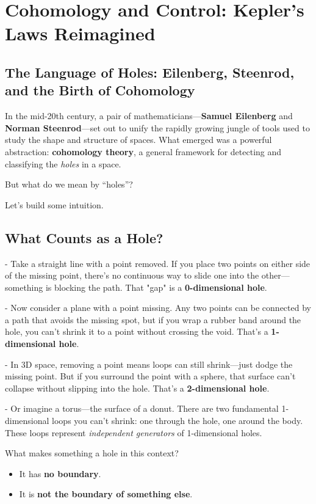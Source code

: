 \section{Cohomology and Control: Kepler’s Laws Reimagined}

\subsection{The Language of Holes: Eilenberg, Steenrod, and the Birth of Cohomology}

In the mid-20th century, a pair of mathematicians—\textbf{Samuel Eilenberg} and \textbf{Norman Steenrod}—set out to unify the rapidly growing jungle of tools used to study the shape and structure of spaces. What emerged was a powerful abstraction: \textbf{cohomology theory}, a general framework for detecting and classifying the \textit{holes} in a space.

But what do we mean by “holes”?

Let’s build some intuition.

\subsection{What Counts as a Hole?}

- Take a straight line with a point removed. If you place two points on either side of the missing point, there's no continuous way to slide one into the other—something is blocking the path. That "gap" is a \textbf{0-dimensional hole}.

- Now consider a plane with a point missing. Any two points can be connected by a path that avoids the missing spot, but if you wrap a rubber band around the hole, you can’t shrink it to a point without crossing the void. That’s a \textbf{1-dimensional hole}.

- In 3D space, removing a point means loops can still shrink—just dodge the missing point. But if you surround the point with a sphere, that surface can't collapse without slipping into the hole. That’s a \textbf{2-dimensional hole}.

- Or imagine a torus—the surface of a donut. There are two fundamental 1-dimensional loops you can't shrink: one through the hole, one around the body. These loops represent \textit{independent generators} of 1-dimensional holes.

What makes something a hole in this context?

\begin{itemize}
    \item It has \textbf{no boundary}.
    \item It is \textbf{not the boundary of something else}.
\end{itemize}

